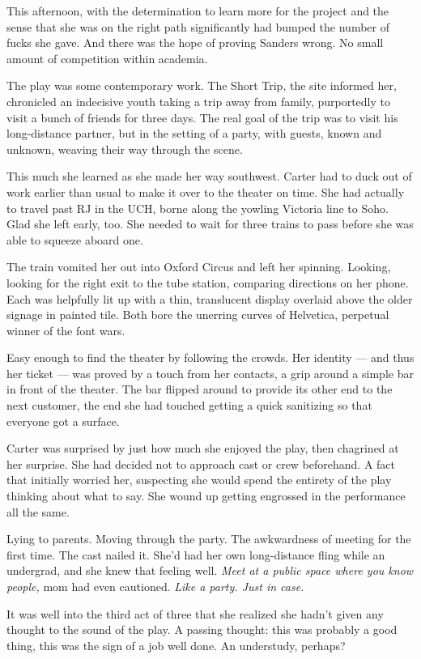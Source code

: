 This afternoon, with the determination to learn more for the project and the sense that she was on the right path significantly had bumped the number of fucks she gave. And there was the hope of proving Sanders wrong. No small amount of competition within academia.

The play was some contemporary work. The Short Trip, the site informed her, chronicled an indecisive youth taking a trip away from family, purportedly to visit a bunch of friends for three days. The real goal of the trip was to visit his long-distance partner, but in the setting of a party, with guests, known and unknown, weaving their way through the scene.

This much she learned as she made her way southwest. Carter had to duck out of work earlier than usual to make it over to the theater on time. She had actually to travel past RJ in the UCH, borne along the yowling Victoria line to Soho. Glad she left early, too. She needed to wait for three trains to pass before she was able to squeeze aboard one.

The train vomited her out into Oxford Circus and left her spinning. Looking, looking for the right exit to the tube station, comparing directions on her phone. Each was helpfully lit up with a thin, translucent display overlaid above the older signage in painted tile. Both bore the unerring curves of Helvetica, perpetual winner of the font wars.

Easy enough to find the theater by following the crowds. Her identity --- and thus her ticket --- was proved by a touch from her contacts, a grip around a simple bar in front of the theater. The bar flipped around to provide its other end to the next customer, the end she had touched getting a quick sanitizing so that everyone got a surface.

Carter was surprised by just how much she enjoyed the play, then chagrined at her surprise. She had decided not to approach cast or crew beforehand. A fact that initially worried her, suspecting she would spend the entirety of the play thinking about what to say. She wound up getting engrossed in the performance all the same.

Lying to parents. Moving through the party. The awkwardness of meeting for the first time. The cast nailed it. She'd had her own long-distance fling while an undergrad, and she knew that feeling well. \emph{Meet at a public space where you know people,} mom had even cautioned. \emph{Like a party. Just in case.}

It was well into the third act of three that she realized she hadn't given any thought to the sound of the play. A passing thought: this was probably a good thing, this was the sign of a job well done. An understudy, perhaps?

